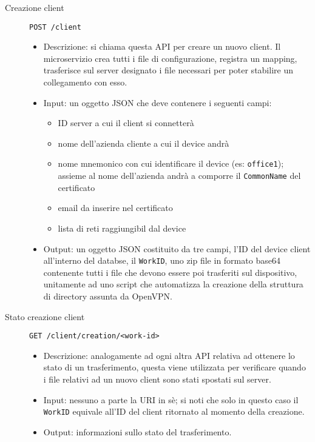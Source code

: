 \begin{description}
    \item[Creazione client]\texttt{POST /client}
    \begin{itemize}
        \item Descrizione: si chiama questa API per creare un nuovo client. Il microservizio
        crea tutti i file di configurazione, registra un mapping, trasferisce sul
        server designato i file necessari per poter stabilire un collegamento con esso.
        \item Input: un oggetto JSON che deve contenere i seguenti campi:
        \begin{itemize}
            \item ID server a cui il client si connetterà
            \item nome dell'azienda cliente a cui il device andrà
            \item nome mnemonico con cui identificare il device (es: \texttt{office1});
            assieme al nome dell'azienda andrà a comporre il \texttt{CommonName} del
            certificato
            \item email da inserire nel certificato
            \item lista di reti raggiungibil dal device
        \end{itemize}
        \item Output: un oggetto JSON costituito da tre campi, l'ID del device client
        all'interno del databse, il \texttt{WorkID}, uno zip file in formato base64 contenente tutti
        i file che devono essere poi trasferiti sul dispositivo, unitamente ad
        uno script che automatizza la creazione della struttura di directory assunta
        da OpenVPN.
    \end{itemize}

    \item[Stato creazione client]\texttt{GET /client/creation/<work-id>}
    \begin{itemize}
        \item Descrizione: analogamente ad ogni altra API relativa ad ottenere
        lo stato di un trasferimento, questa viene utilizzata per verificare
        quando i file relativi ad un nuovo client sono stati spostati sul server.
        \item Input: nessuno a parte la URI in sè; si noti che solo in questo caso il
        \texttt{WorkID} equivale all'ID del client ritornato al momento della creazione.
        \item Output: informazioni sullo stato del trasferimento.
    \end{itemize}


\end{description}
